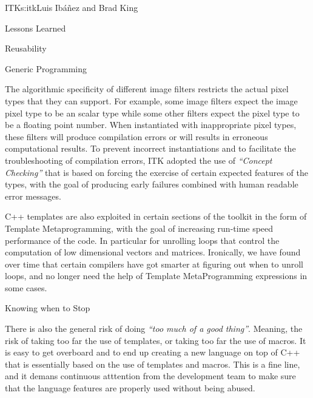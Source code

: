 \begin{aosachapter}{ITK}{s:itk}{Luis Ib\'{a}\~{n}ez and Brad King}
\begin{aosasect1}{Lessons Learned}
\begin{aosasect2}{Reusability}
\begin{aosasect3}{Generic Programming}
\begin{aosaitemize}
\item {}
\item {}
\end{aosaitemize}

The algorithmic specificity of different image filters restricts the actual
pixel types that they can support. For example, some image filters expect the
image pixel type to be an scalar type while some other filters expect the pixel
type to be a floating point number. When instantiated with inappropriate pixel
types, these filters will produce compilation errors or will results in
erroneous computational results. To prevent incorrect instantiations and to
facilitate the troubleshooting of compilation errors, ITK adopted the use of
\emph{``Concept Checking''} that is based on forcing the exercise of certain
expected features of the types, with the goal of producing early failures
combined with human readable error messages.

C++ templates are also exploited in certain sections of the toolkit in the form
of Template Metaprogramming, with the goal of increasing run-time speed
performance of the code. In particular for unrolling loops that control the
computation of low dimensional vectors and matrices. Ironically, we have found
over time that certain compilers have got smarter at figuring out when to
unroll loops, and no longer need the help of Template MetaProgramming
expressions in some cases.

\end{aosasect3}


\begin{aosasect3}{Knowing when to Stop}

There is also the general risk of doing \emph{``too much of a good thing''}.
Meaning, the risk of taking too far the use of templates, or taking too far the
use of macros. It is easy to get overboard and to end up creating a new
language on top of C++ that is essentially based on the use of templates and
macros. This is a fine line, and it demans continuous atttention from the
development team to make sure that the language features are properly used
without being abused.


\end{aosasect3}
\end{aosasect2}
\end{aosasect1}
\end{aosachapter}
